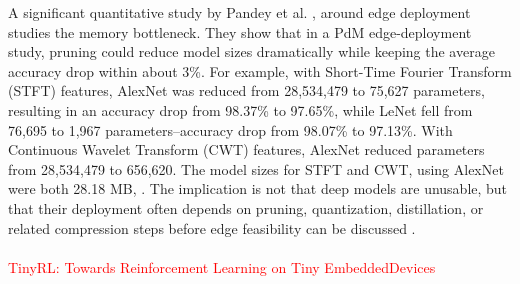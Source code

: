 \documentclass[sn-basic]{sn-jnl} %
\begin{document}

A significant quantitative study by Pandey et al. \cite{Pandey2023}, around edge deployment studies the memory bottleneck. They show that in a PdM edge-deployment study, pruning could reduce model sizes dramatically while keeping the average accuracy drop within about 3\%. For example, with Short-Time Fourier Transform (STFT) features, AlexNet was reduced from 28,534,479 to 75,627 parameters, resulting in an accuracy drop from 98.37\% to 97.65\%, while LeNet fell from 76,695 to 1,967 parameters--accuracy drop from 98.07\% to 97.13\%. With Continuous Wavelet Transform (CWT) features, AlexNet reduced parameters from 28,534,479 to 656,620. The model sizes for STFT and CWT, using AlexNet were both 28.18 MB, \cite{Pandey2023}. The implication is not that deep models are unusable, but that their deployment often depends on pruning, quantization, distillation, or related compression steps before edge feasibility can be discussed \cite{Pandey2023, Jang2020, Xu2022}.
\\
\\
\textcolor{red}{TinyRL: Towards Reinforcement Learning on Tiny EmbeddedDevices}\\
\end{document}
